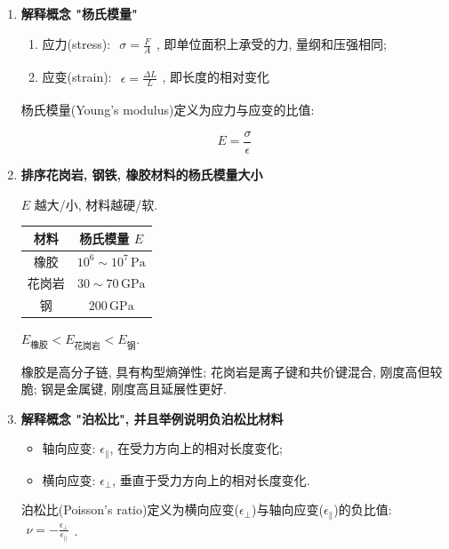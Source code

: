 \documentclass[../../main.tex]{subfiles}
\begin{document}
\begin{enumerate}
    \item \textbf{解释概念 "杨氏模量"}
\begin{enumerate}
    \item 应力(stress): $\begin{aligned}\sigma = \frac{F}{A}\end{aligned}$, 即单位面积上承受的力, 量纲和压强相同;
    \item 应变(strain): $\begin{aligned}\epsilon = \frac{\Delta L}{L}\end{aligned}$, 即长度的相对变化
\end{enumerate}

杨氏模量(Young's modulus)定义为应力与应变的比值:

$$
E = \frac{\sigma}{\epsilon}
$$

    \item \textbf{排序花岗岩, 钢铁, 橡胶材料的杨氏模量大小}

$E$ 越大/小, 材料越硬/软.

\begin{table}[h]
\centering
\begin{tabular}{|c|c|}
\hline
材料 & 杨氏模量 $E$ \\
\hline
橡胶 & $10^{6}\sim 10^{7}\,\mathrm{Pa}$ \\
花岗岩 & $30\sim 70\,\mathrm{GPa}$ \\
钢 & $200\,\mathrm{GPa}$ \\
\hline
\end{tabular}
\end{table}

$\boxed{E_{\text{橡胶}} < E_{\text{花岗岩}} < E_{\text{钢}}}$.

橡胶是高分子链, 具有构型熵弹性; 花岗岩是离子键和共价键混合, 刚度高但较脆; 钢是金属键, 刚度高且延展性更好. 

    \item \textbf{解释概念 "泊松比", 并且举例说明负泊松比材料}

\begin{itemize}
    \item 轴向应变: $\epsilon_{\parallel}$, 在受力方向上的相对长度变化;
    \item 横向应变: $\epsilon_{\perp}$, 垂直于受力方向上的相对长度变化.
\end{itemize}

泊松比(Poisson's ratio)定义为横向应变($\epsilon_{\perp}$)与轴向应变($\epsilon_{\parallel}$)的负比值: $\begin{aligned}
    \nu = -\frac{\epsilon_{\perp}}{\epsilon_{\parallel}}
\end{aligned}$. 


\end{enumerate}
\end{document}
